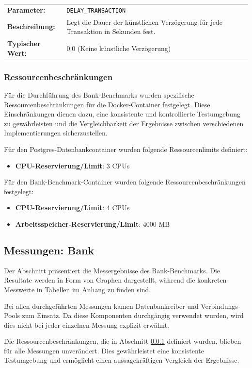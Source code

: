 \documentclass[fontsize=12pt,paper=a4,twoside=semi,parskip=half-,headsepline,headinclude]{scrreprt}
\begin{document}
\begin{tabularx}{\textwidth}{@{}lX@{}}
	\textbf{Parameter:} & \texttt{DELAY\_TRANSACTION} \\
	\textbf{Beschreibung:} & Legt die Dauer der künstlichen Verzögerung für jede Transaktion in Sekunden fest. \\
	\textbf{Typischer Wert:} & 0.0 (Keine künstliche Verzögerung)
\end{tabularx}

\subsubsection{Ressourcenbeschränkungen}
\label{subsubsec:bankRes}

Für die Durchführung des Bank-Benchmarks wurden spezifische Ressourcenbe\-schrän\-kun\-gen für die Docker-Container festgelegt. Diese Einschränkungen dienen dazu, eine konsistente und kontrollierte Testumgebung zu gewährleisten und die Vergleichbarkeit der Ergebnisse zwischen verschiedenen Implementierungen sicherzustellen.

Für den Postgres-Datenbankcontainer wurden folgende Ressourcenlimits definiert:
\begin{itemize}
	\item \textbf{CPU-Reservierung/Limit}: 3 CPUs
\end{itemize}

Für den Bank-Benchmark-Container wurden folgende Ressourcenbeschränkungen festgelegt:
\begin{itemize}
	\item \textbf{CPU-Reservierung/Limit}: 4 CPUs
	\item \textbf{Arbeitsspeicher-Reservierung/Limit}: 4000 MB
\end{itemize}

\subsection{Messungen: Bank}

Der Abschnitt präsentiert die Messergebnisse des Bank-Benchmarks. Die Resultate werden in Form von Graphen dargestellt, während die konkreten Messwerte in Tabellen im Anhang zu finden sind.

Bei allen durchgeführten Messungen kamen Datenbankreiber und Verbindungs-Pools zum Einsatz. Da diese Komponenten durchgängig verwendet wurden, wird dies nicht bei jeder einzelnen Messung explizit erwähnt.

Die Ressourcenbeschränkungen, die in Abschnitt \ref{subsubsec:bankRes} definiert wurden, blieben für alle Messungen unverändert. Dies gewährleistet eine konsistente Testumgebung und ermöglicht einen aussagekräftigen Vergleich der Ergebnisse.
\end{document}
